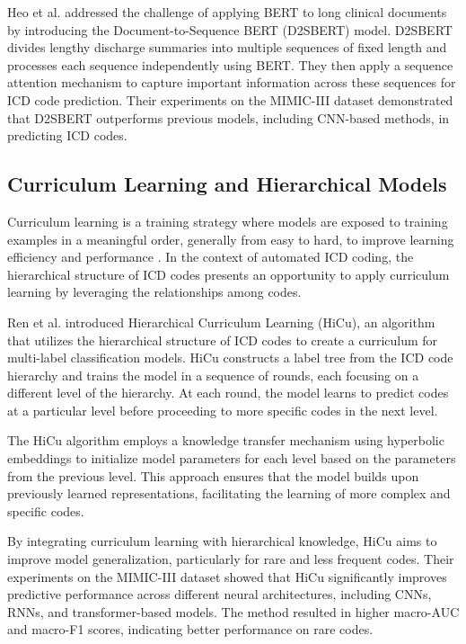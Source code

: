 \documentclass[12pt,a4paper]{report}
\begin{document}
Heo et al. \cite{heo2022medical} addressed the challenge of applying BERT to long clinical documents by introducing the Document-to-Sequence BERT (D2SBERT) model. D2SBERT divides lengthy discharge summaries into multiple sequences of fixed length and processes each sequence independently using BERT. They then apply a sequence attention mechanism to capture important information across these sequences for ICD code prediction. Their experiments on the MIMIC-III dataset demonstrated that D2SBERT outperforms previous models, including CNN-based methods, in predicting ICD codes.

\subsection{Curriculum Learning and Hierarchical Models}

Curriculum learning is a training strategy where models are exposed to training examples in a meaningful order, generally from easy to hard, to improve learning efficiency and performance \cite{bengio2009curriculum}. In the context of automated ICD coding, the hierarchical structure of ICD codes presents an opportunity to apply curriculum learning by leveraging the relationships among codes.

Ren et al. \cite{ren2022hicu} introduced Hierarchical Curriculum Learning (HiCu), an algorithm that utilizes the hierarchical structure of ICD codes to create a curriculum for multi-label classification models. HiCu constructs a label tree from the ICD code hierarchy and trains the model in a sequence of rounds, each focusing on a different level of the hierarchy. At each round, the model learns to predict codes at a particular level before proceeding to more specific codes in the next level.

The HiCu algorithm employs a knowledge transfer mechanism using hyperbolic embeddings to initialize model parameters for each level based on the parameters from the previous level. This approach ensures that the model builds upon previously learned representations, facilitating the learning of more complex and specific codes.

By integrating curriculum learning with hierarchical knowledge, HiCu aims to improve model generalization, particularly for rare and less frequent codes. Their experiments on the MIMIC-III dataset showed that HiCu significantly improves predictive performance across different neural architectures, including CNNs, RNNs, and transformer-based models. The method resulted in higher macro-AUC and macro-F1 scores, indicating better performance on rare codes.
\end{document}
